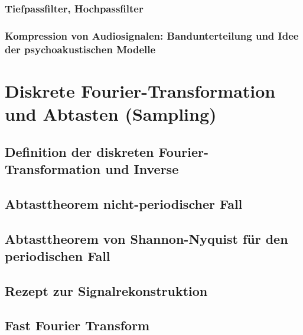 \subsubsection{Tiefpassfilter, Hochpassfilter}
\subsubsection{Kompression von Audiosignalen: Bandunterteilung und Idee der psychoakustischen Modelle}
\section{Diskrete Fourier-Transformation und Abtasten (Sampling)}
\subsection{Definition der diskreten Fourier-Transformation und Inverse}
\subsection{Abtasttheorem nicht-periodischer Fall}
\subsection{Abtasttheorem von Shannon-Nyquist für den periodischen Fall}
\subsection{Rezept zur Signalrekonstruktion}
\subsection{Fast Fourier Transform}